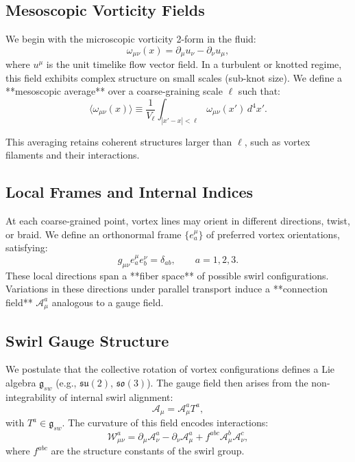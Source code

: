 \documentclass[12pt]{article}
\begin{document}
    \subsection*{Mesoscopic Vorticity Fields}

    We begin with the microscopic vorticity 2-form in the fluid:
    \[
        \omega_{\mu\nu}(x) = \partial_\mu u_\nu - \partial_\nu u_\mu,
    \]
    where \( u^\mu \) is the unit timelike flow vector field. In a turbulent or knotted regime, this field exhibits complex structure on small scales (sub-knot size). We define a **mesoscopic average** over a coarse-graining scale \( \ell \) such that:
    \[
        \langle \omega_{\mu\nu}(x) \rangle \equiv \frac{1}{V_\ell} \int_{|x'-x|<\ell} \omega_{\mu\nu}(x')\, d^4x'.
    \]

    This averaging retains coherent structures larger than \( \ell \), such as vortex filaments and their interactions.

    \subsection*{Local Frames and Internal Indices}

    At each coarse-grained point, vortex lines may orient in different directions, twist, or braid. We define an orthonormal frame \( \{ e_a^\mu \} \) of preferred vortex orientations, satisfying:
    \[
        g_{\mu\nu} e^\mu_a e^\nu_b = \delta_{ab}, \qquad a=1,2,3.
    \]
    These local directions span a **fiber space** of possible swirl configurations. Variations in these directions under parallel transport induce a **connection field** \( \mathcal{A}_\mu^a \) analogous to a gauge field.

    \subsection*{Swirl Gauge Structure}

    We postulate that the collective rotation of vortex configurations defines a Lie algebra \( \mathfrak{g}_{sw} \) (e.g., \( \mathfrak{su}(2) \), \( \mathfrak{so}(3) \)). The gauge field then arises from the non-integrability of internal swirl alignment:
    \[
        \mathcal{A}_\mu = \mathcal{A}_\mu^a T^a,
    \]
    with \( T^a \in \mathfrak{g}_{sw} \). The curvature of this field encodes interactions:
    \[
        \mathcal{W}_{\mu\nu}^a = \partial_\mu \mathcal{A}_\nu^a - \partial_\nu \mathcal{A}_\mu^a + f^{abc} \mathcal{A}_\mu^b \mathcal{A}_\nu^c,
    \]
    where \( f^{abc} \) are the structure constants of the swirl group.
\end{document}
